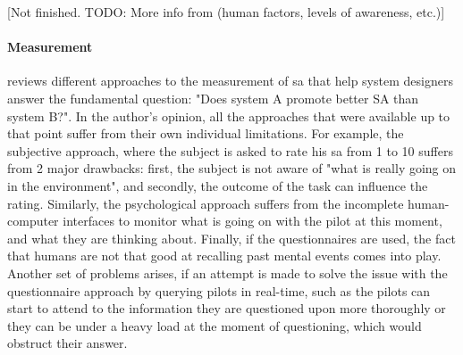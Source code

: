 [Not finished. TODO: More info from \cite{endsley_situation_1988} (human factors, levels of awareness, etc.)]

\paragraph{Measurement}
\cite[p.~791-792]{endsley_situation_1988} reviews different approaches to the measurement of \gls{sa} that help system designers answer the fundamental question: "Does system A promote better SA than system B?". In the author's opinion, all the approaches that were available up to that point suffer from their own individual limitations. For example, the subjective approach, where the subject is asked to rate his \gls{sa} from 1 to 10 suffers from 2 major drawbacks: first, the subject is not aware of "what is really going on in the environment", and secondly, the outcome of the task can influence the rating. Similarly, the psychological approach suffers from the incomplete human-computer interfaces to monitor what is going on with the pilot at this moment, and what they are thinking about. Finally, if the questionnaires are used, the fact that humans are not that good at recalling past mental events comes into play. Another set of problems arises, if an attempt is made to solve the issue with the questionnaire approach by querying pilots in real-time, such as the pilots can start to attend to the information they are questioned upon more thoroughly or they can be under a heavy load at the moment of questioning, which would obstruct their answer.

